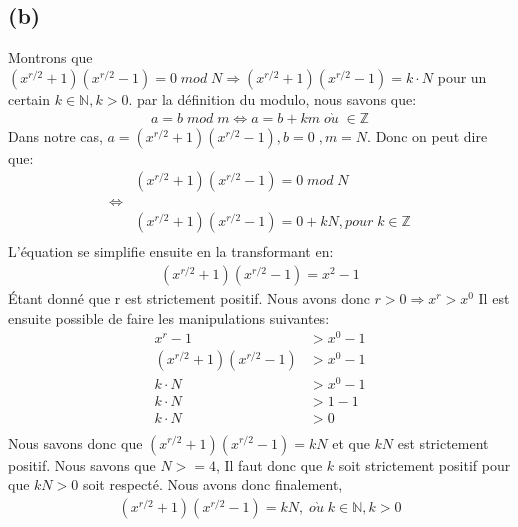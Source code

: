 \documentclass{article}
\begin{document}
\subsection*{(b)}
\begin{flushleft}
Montrons que $(x^{r/2} + 1)(x^{r/2} - 1) = 0\; mod\; N \Longrightarrow (x^{r/2} + 1)(x^{r / 2} - 1) = k \cdot N$
pour un certain $k \in \mathbb{N}, k > 0$.
\newline
\newline
par la définition du modulo, nous savons que:
\begin{align*} a=b\;mod\;m \Longleftrightarrow a = b + km\; o\grave{u}\; \in \mathbb{Z} \end{align*}
\newline
Dans notre cas, $a=(x^{r/2} + 1)(x^{r/2} - 1), b = 0\;, m = N$. Donc on peut dire que:
\begin{align*}
    &(x^{r/2} + 1)(x^{r/2} - 1) = 0\; mod\; N\\
     \Longleftrightarrow \\
    &(x^{r/2} + 1)(x^{r/2} - 1) = 0 + kN, pour\; k \in \mathbb{Z} \\
\end{align*}
L'équation se simplifie ensuite en la transformant en:
\begin{align*}
    (x^{r/2} + 1)(x^{r/2} - 1) = x^2 - 1
\end{align*}
\newline
Étant donné que r est strictement positif. Nous avons donc $r > 0\Longrightarrow x^r > x^0$
\newline
Il est ensuite possible de faire les manipulations suivantes:
\begin{align*}
    x^r - 1 &> x^0 - 1 \\
    (x^{r/2} + 1)(x^{r/2} - 1) &> x^0 - 1 \\
    k\cdot N &> x^0 - 1 \\
    k\cdot N &> 1 - 1 \\
    k \cdot N &> 0 \\
\end{align*}
Nous savons donc que $(x^{r/2} + 1)(x^{r/2} - 1) = kN$ et que $kN$ est strictement positif. Nous savons que $N>=4$, Il faut donc
que $k$ soit strictement positif pour que $kN > 0$ soit respecté. Nous avons donc finalement,
\begin{align*}
    (x^{r/2} + 1)(x^{r/2} - 1) = kN,\; o\grave{u}\; k \in \mathbb{N}, k > 0
\end{align*} \\

\end{flushleft}
\end{document}
